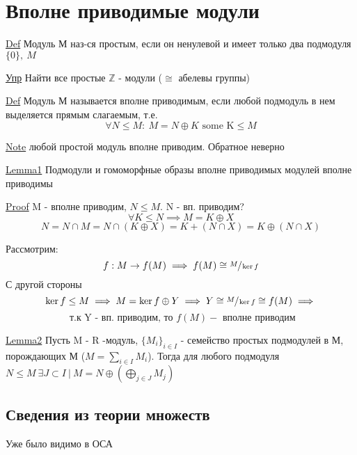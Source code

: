 \documentclass[a4paper]{article}
\begin{document}
\section*{\centering Вполне приводимые модули}

\begin{tcolorbox}
\underline{Def} Модуль М наз-ся простым, если он ненулевой и имеет только два 
подмодуля $ \{0\}, \ M $ 
\end{tcolorbox}

\underline{Упр} Найти все простые $ \mathbb{Z} $ - модули ($ \cong $ абелевы группы)

\begin{tcolorbox}
\underline{Def} Модуль М называется вполне приводимым, если любой подмодуль в нем
выделяется прямым слагаемым, т.е. 
\[
    \forall N \leq M: \ M = N \oplus K \text{ some K}\leq M
\]

\underline{Note} любой простой модуль вполне приводим. Обратное неверно
\end{tcolorbox}

\begin{tcolorbox}
\underline{Lemma1} Подмодули и гомоморфные образы вполне приводимых модулей 
вполне приводимы

\underline{Proof} M - вполне приводим, $ N \leq M $. N - вп. приводим? 
\[
    \forall K \leq N \implies M = K \oplus X
\]
\[
    N = N \cap M = N \cap (K \oplus X) = K + (N \cap X) = K \oplus (N \cap X)
\]

Рассмотрим:
\[
    f: M \to f(M) \implies f(M) \cong \sfrac{M}{\ker f}  
\]
С другой стороны
\[
    \ker f \leq M \implies M = \ker f \oplus Y \implies Y \cong \sfrac{M}{\ker f} 
    \cong f(M) \implies
\]
\[
    \text{ т.к Y - вп. приводим, то } f(M) - \text{ вполне приводим}
\]
\end{tcolorbox}

\begin{tcolorbox}
    \underline{Lemma2} Пусть M - R -модуль, $ \{ M_i \}_{i \in I} $ - семейство простых
    подмодулей в М, порождающих М ($ M = \sum_{i \in I} M_i $). Тогда для любого
    подмодуля $ N \leq M\ \exists J \subset I \ | \ M = N \oplus (\bigoplus
    _{j \in J} M_j)$ 
\end{tcolorbox}

\subsection*{Сведения из теории множеств}
Уже было видимо в ОСА
\end{document}
